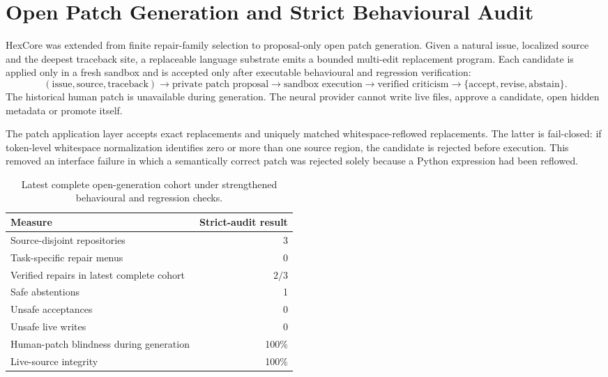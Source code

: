 \section{Open Patch Generation and Strict Behavioural Audit}
\label{sec:open-patch-generation}

HexCore was extended from finite repair-family selection to proposal-only open
patch generation.  Given a natural issue, localized source and the deepest
traceback site, a replaceable language substrate emits a bounded multi-edit
replacement program.  Each candidate is applied only in a fresh sandbox and is
accepted only after executable behavioural and regression verification:
\[
  (\text{issue},\text{source},\text{traceback})
  \rightarrow \text{private patch proposal}
  \rightarrow \text{sandbox execution}
  \rightarrow \text{verified criticism}
  \rightarrow \{\text{accept},\text{revise},\text{abstain}\}.
\]
The historical human patch is unavailable during generation.  The neural
provider cannot write live files, approve a candidate, open hidden metadata or
promote itself.

The patch application layer accepts exact replacements and uniquely matched
whitespace-reflowed replacements.  The latter is fail-closed: if token-level
whitespace normalization identifies zero or more than one source region, the
candidate is rejected before execution.  This removed an interface failure in
which a semantically correct patch was rejected solely because a Python
expression had been reflowed.

\begin{table}[htbp]
\centering
\begin{tabular}{lr}
\hline
Measure & Strict-audit result \\
\hline
Source-disjoint repositories & 3 \\
Task-specific repair menus & 0 \\
Verified repairs in latest complete cohort & $2/3$ \\
Safe abstentions & 1 \\
Unsafe acceptances & 0 \\
Unsafe live writes & 0 \\
Human-patch blindness during generation & 100\% \\
Live-source integrity & 100\% \\
\hline
\end{tabular}
\caption{Latest complete open-generation cohort under strengthened behavioural
and regression checks.}
\end{table}

